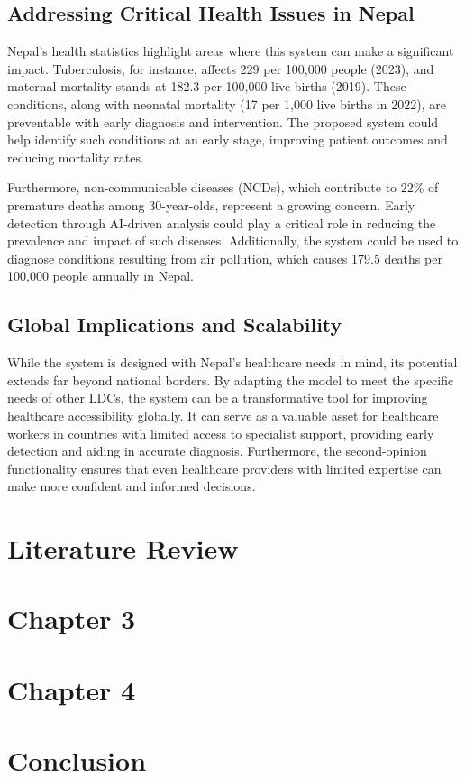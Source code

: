 \documentclass[12pt,a4paper]{report}
\begin{document}
\section{Addressing Critical Health Issues in Nepal}
Nepal's health statistics highlight areas where this system can make a significant impact. Tuberculosis, for instance, affects 229 per 100,000 people (2023), and maternal mortality stands at 182.3 per 100,000 live births (2019). These conditions, along with neonatal mortality (17 per 1,000 live births in 2022), are preventable with early diagnosis and intervention. The proposed system could help identify such conditions at an early stage, improving patient outcomes and reducing mortality rates\cite{Nepal_profile}.

Furthermore, non-communicable diseases (NCDs), which contribute to 22\% of premature deaths among 30-year-olds, represent a growing concern. Early detection through AI-driven analysis could play a critical role in reducing the prevalence and impact of such diseases. Additionally, the system could be used to diagnose conditions resulting from air pollution, which causes 179.5 deaths per 100,000 people annually in Nepal\cite{Nepal_profile}.

\section{Global Implications and Scalability}
While the system is designed with Nepal's healthcare needs in mind, its potential extends far beyond national borders. By adapting the model to meet the specific needs of other LDCs, the system can be a transformative tool for improving healthcare accessibility globally. It can serve as a valuable asset for healthcare workers in countries with limited access to specialist support, providing early detection and aiding in accurate diagnosis. Furthermore, the second-opinion functionality ensures that even healthcare providers with limited expertise can make more confident and informed decisions.

\pagebreak
\chapter{Literature Review}


\chapter{Chapter 3}



\chapter{Chapter 4}

\chapter{Conclusion}

\raggedright
	
\end{document}
